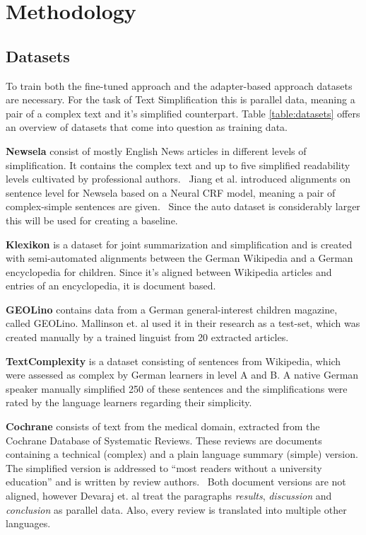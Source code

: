 \section{Methodology}

\subsection{Datasets}
To train both the fine-tuned approach and the adapter-based approach datasets are necessary.
For the task of Text Simplification this is parallel data, meaning a pair of a complex text and it's simplified counterpart.
Table \ref{table:datasets} offers an overview of datasets that come into question as training data.

\textbf{Newsela} consist of mostly English News articles in different levels of simplification.
It contains the complex text and up to five simplified readability levels cultivated by professional authors.~\cite{AlvaManchego2020}
Jiang et al. introduced alignments on sentence level for Newsela based on a Neural CRF model,
meaning a pair of complex-simple sentences are given.~\cite{Jiang2020}
Since the auto dataset is considerably larger this will be used for creating a baseline.

\textbf{Klexikon} is a dataset for joint summarization and simplification and is created with semi-automated alignments between the German
Wikipedia and a German encyclopedia for children. Since it's aligned between Wikipedia articles and entries of an encyclopedia, it is document based.~\cite{Aumiller2022}

\textbf{GEOLino} contains data from a German general-interest children magazine, called GEOLino. Mallinson et. al used it in their research as a test-set,
which was created manually by a trained linguist from 20 extracted articles.~\cite{Mallinson2020}

\textbf{TextComplexity} is a dataset consisting of sentences from Wikipedia, which were assessed as complex by German learners in level
A and B. A native German speaker manually simplified 250 of these sentences and the simplifications were rated by the language learners
regarding their simplicity.~\cite{Mallinson2020}

\textbf{Cochrane} consists of text from the medical domain, extracted from the Cochrane Database of Systematic Reviews.
These reviews are documents containing a technical (complex) and a plain language summary (simple) version.
The simplified version is addressed to ``most readers without a university education'' and is written by review authors.~\cite{Devaraj2021}
Both document versions are not aligned, however Devaraj et. al treat the paragraphs \emph{results}, \emph{discussion} and \emph{conclusion}
as parallel data.
Also, every review is translated into multiple other languages.

